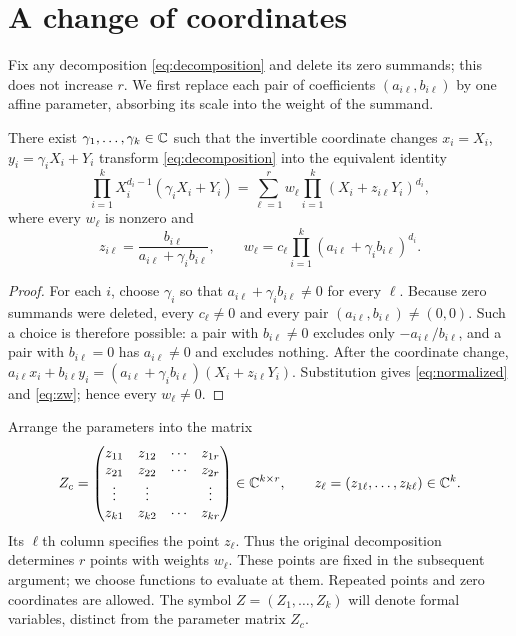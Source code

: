 \section{A change of coordinates}\label{sec:coordinates}

Fix any decomposition \eqref{eq:decomposition} and delete its zero
summands; this does not increase $r$.
We first replace each pair of coefficients $(a_{i\ell},b_{i\ell})$ by one
affine parameter, absorbing its scale into the weight of the summand.

\begin{lemma}\label{lem:coordinates}
There exist $\gamma_1,\ldots,\gamma_k\in\mathbb C$ such that the invertible
coordinate changes $x_i=X_i$, $y_i=\gamma_iX_i+Y_i$ transform
\eqref{eq:decomposition} into the equivalent identity
\begin{equation}\label{eq:normalized}
\prod_{i=1}^k X_i^{d_i-1}(\gamma_iX_i+Y_i)
=\sum_{\ell=1}^r w_\ell\prod_{i=1}^k(X_i+z_{i\ell}Y_i)^{d_i},
\end{equation}
where every $w_\ell$ is nonzero and
\begin{equation}\label{eq:zw}
z_{i\ell}=\frac{b_{i\ell}}{a_{i\ell}+\gamma_i b_{i\ell}},
\qquad
w_\ell=c_\ell\prod_{i=1}^k(a_{i\ell}+\gamma_i b_{i\ell})^{d_i}.
\end{equation}
\end{lemma}
\begin{proof}
For each $i$, choose $\gamma_i$ so that
$a_{i\ell}+\gamma_i b_{i\ell}\ne0$ for every $\ell$. Because zero
summands were deleted, every $c_\ell\ne0$ and every pair
$(a_{i\ell},b_{i\ell})\ne(0,0)$. Such a choice is therefore
possible: a pair with $b_{i\ell}\ne0$ excludes only
$-a_{i\ell}/b_{i\ell}$, and a pair with $b_{i\ell}=0$ has
$a_{i\ell}\ne0$ and excludes nothing.
After the coordinate change,
$a_{i\ell}x_i+b_{i\ell}y_i
=(a_{i\ell}+\gamma_i b_{i\ell})(X_i+z_{i\ell}Y_i)$.
Substitution gives \eqref{eq:normalized} and \eqref{eq:zw}; hence
every $w_\ell\ne0$.
\end{proof}

Arrange the parameters into the matrix
\begin{equation}\label{eq:Zc}
Z_c=
\begin{pmatrix}
z_{11}&z_{12}&\cdots&z_{1r}\\
z_{21}&z_{22}&\cdots&z_{2r}\\
\vdots&\vdots&&\vdots\\
z_{k1}&z_{k2}&\cdots&z_{kr}
\end{pmatrix}\in\mathbb C^{k\times r},
\qquad z_\ell=(z_{1\ell},\ldots,z_{k\ell})\in\mathbb C^k.
\end{equation}
Its $\ell$th column specifies the point $z_\ell$. Thus the original
decomposition determines $r$ points with weights $w_\ell$.
These points are fixed in the subsequent argument; we choose functions
to evaluate at them. Repeated points and zero coordinates are allowed.
The symbol $Z=(Z_1,\ldots,Z_k)$ will denote formal variables, distinct
from the parameter matrix $Z_c$.
